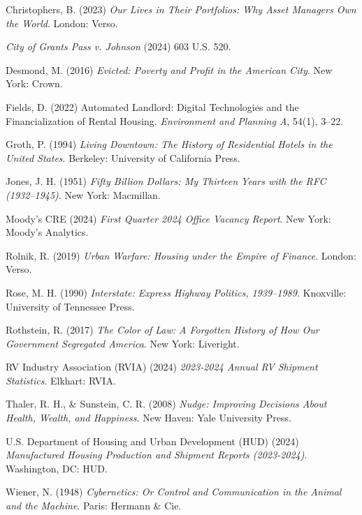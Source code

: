 \documentclass[
  12pt,
]{article}
\begin{document}
Christophers, B. (2023) \emph{Our Lives in Their Portfolios: Why Asset Managers Own the World}. London: Verso.

\emph{City of Grants Pass v. Johnson} (2024) 603 U.S. 520.

Desmond, M. (2016) \emph{Evicted: Poverty and Profit in the American City}. New York: Crown.

Fields, D. (2022) Automated Landlord: Digital Technologies and the Financialization of Rental Housing. \emph{Environment and Planning A}, 54(1), 3--22.

Groth, P. (1994) \emph{Living Downtown: The History of Residential Hotels in the United States}. Berkeley: University of California Press.

Jones, J. H. (1951) \emph{Fifty Billion Dollars: My Thirteen Years with the RFC (1932--1945)}. New York: Macmillan.

Moody's CRE (2024) \emph{First Quarter 2024 Office Vacancy Report}. New York: Moody's Analytics.

Rolnik, R. (2019) \emph{Urban Warfare: Housing under the Empire of Finance}. London: Verso.

Rose, M. H. (1990) \emph{Interstate: Express Highway Politics, 1939--1989}. Knoxville: University of Tennessee Press.

Rothstein, R. (2017) \emph{The Color of Law: A Forgotten History of How Our Government Segregated America}. New York: Liveright.

RV Industry Association (RVIA) (2024) \emph{2023-2024 Annual RV Shipment Statistics}. Elkhart: RVIA.

Thaler, R. H., \& Sunstein, C. R. (2008) \emph{Nudge: Improving Decisions About Health, Wealth, and Happiness}. New Haven: Yale University Press.

U.S. Department of Housing and Urban Development (HUD) (2024) \emph{Manufactured Housing Production and Shipment Reports (2023-2024)}. Washington, DC: HUD.

Wiener, N. (1948) \emph{Cybernetics: Or Control and Communication in the Animal and the Machine}. Paris: Hermann \& Cie.

\newpage
\end{document}
